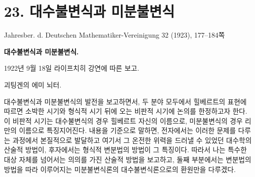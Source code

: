 
\section*{23. 대수불변식과 미분불변식}
\begin{center}
Jahresber. d. Deutschen Mathematiker-Vereinigung 32 (1923), 177--184쪽
\end{center}

\begin{center}
{\Large\bfseries 대수불변식과 미분불변식.}\par
\vspace{0.45em}
1922년 9월 18일 라이프치히 강연에 따른 보고.\par
\vspace{1.0em}
괴팅겐의 \textsc{에미 뇌터}.
\end{center}

\begingroup
\renewcommand{\thefootnote}{\arabic{footnote})}
\setcounter{footnote}{0}
\newcommand{\PXXIIIitem}[2]{\par\noindent\hangindent=2.2em\hangafter=1\makebox[2.2em][l]{#1.}#2\par}

대수불변식과 미분불변식의 발전을 보고하면서, 두 분야 모두에서 힐베르트의 표현에 따르면 소박한 시기와 형식적 시기 뒤에 오는 비판적 시기에 논의를 한정하고자 한다. 이 비판적 시기는 대수불변식의 경우 힐베르트 자신의 이름으로, 미분불변식의 경우 리만의 이름으로 특징지어진다. 내용을 기준으로 말하면, 전자에서는 이러한 문제를 다루는 과정에서 본질적으로 발달하고 여기서 그 온전한 위력을 드러낼 수 있었던 대수학의 산술적 방법이, 후자에서는 형식적 변분법의 방법이 그 특징이다. 따라서 나는 특수한 대상 자체를 넘어서는 의의를 가진 산술적 방법을 보고하고, 둘째 부분에서는 변분법의 방법을 따라 이루어지는 미분불변식론의 대수불변식론으로의 환원만을 다루겠다.

